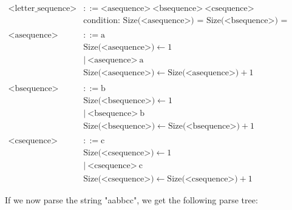 \[
\begin{aligned}
  \text{<letter\_sequence>} &::= \text{<asequence>} \ \text{<bsequence>} \ \text{<csequence>} \\
  &\text{condition: Size(<asequence>) = Size(<bsequence>) = Size(<csequence>)} \\
  \\
  \text{<asequence>} &::= \text{a} \\
  &\text{Size(<asequence>)} \leftarrow 1 \\
  &| \ \text{<asequence>} \ \text{a} \\
  &\text{Size(<asequence>)} \leftarrow \text{Size(<asequence>)} + 1 \\
  \\
  \text{<bsequence>} &::= \text{b} \\
  &\text{Size(<bsequence>)} \leftarrow 1 \\
  &| \ \text{<bsequence>} \ \text{b} \\
  &\text{Size(<bsequence>)} \leftarrow \text{Size(<bsequence>)} + 1 \\
  \\
  \text{<csequence>} &::= \text{c} \\
  &\text{Size(<csequence>)} \leftarrow 1 \\
  &| \ \text{<csequence>} \ \text{c} \\
  &\text{Size(<csequence>)} \leftarrow \text{Size(<csequence>)} + 1   
\end{aligned}
\]

If we now parse the string "aabbcc", we get the following parse tree:

\vspace{1cm}


